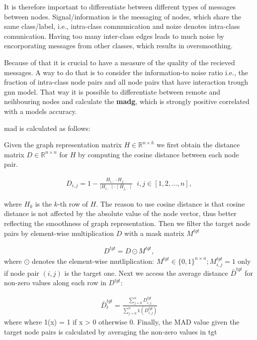 It is therefore important to differentiate between different types of messages between nodes. Signal/information is the messaging of nodes, which share the same class/label, i.e., intra-class communication and noize denotes intra-class comunication. Having too many inter-class edges leads to much noise by encorporating messages from other classes, which results in oversmoothing.

Because of that it is crucial to have a measure of the quality of the recieved messages. A way to do that is to consider the information-to noise ratio i.e., the fraction of intra-class node pairs and all node pairs that have interaction trough \ac{gnn} model. That way it is possible to differentiate between remote and neihbouring nodes and calculate the \textbf{\ac{madg}}, which is strongly positive correlated with a models accuracy.

\ac{mad} is calculated as follows:

Given the graph representation matrix $H \in \mathbb{R}^{n \times h}$ we
first obtain the distance matrix $D \in \mathbb{R}^{n \times n}$ for $H$ by
computing the cosine distance between each node pair.

\begin{align*}
    D_{i,j} = 1 - \frac{H_{i,:} \cdot H_{j,:}}{\mid H_{i,:}\mid  \cdot \mid H_{j,:}\mid} \; \;  i,j \in [1,2, \dots, n],
\end{align*}

where $H_{k}$ is the $k$-th row of $H$. The reason to use cosine distance is that cosine distance is not affected by the absolute value of the node vector,
thus better reflecting the smoothness of graph representation. Then we filter the target node pairs by element-wise multiplication $D$ with a mask matrix $M^{tgt}$

\begin{align*}
    D^{tgt} = D \odot M^{tgt},
\end{align*}
where $\odot$ denotes the element-wise mutliplication: $M^{tgt} \in \{0,1\}^{n \times n}; M_{i,j}^{tgt}= 1$ only if node pair $(i,j)$ is the target one.
Next we access the average distance $\bar{D}^{tgt}$ for non-zero values along each row in $D^{tgt}:$

\begin{align*}
    \bar{D}_{t}^{tgt} = \frac{\sum_{j=0}^{n}D_{i,j}^{tgt}}{\sum_{j=0}^{n}\mathds{1}(D_{i,j}^{tgt})}
\end{align*}
where where 1(x) = 1 if x > 0 otherwise 0. Finally, the MAD
value given the target node pairs is calculated by averaging
the non-zero values in
tgt

